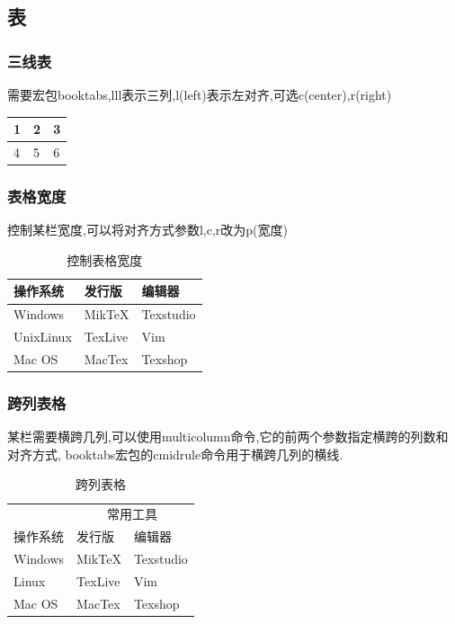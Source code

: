 \documentclass[UTF8,a4paper,8pt,no-math]{article} %
\numberwithin{equation}{section} %
\begin{document}
\subsection{表}
\subsubsection{三线表}
需要宏包booktabs,lll表示三列,l(left)表示左对齐,可选c(center),r(right)
\begin{table}[htbp]
	\center
	\begin{tabular}{lll}
		\toprule
		\toprule
		1 & 2 & 3 \\
		\midrule
		4 & 5 & 6 \\
		\bottomrule
	\end{tabular}
\end{table}

\subsubsection{表格宽度}
控制某栏宽度,可以将对齐方式参数l,c,r改为p(宽度)
\begin{table}[htbp]
	\caption{控制表格宽度}
	\center
	\begin{tabular}{p{100pt}p{100pt}p{100pt}}
		\toprule
		操作系统  & 发行版  & 编辑器    \\
		\midrule
		Windows   & MikTeX  & Texstudio \\
		UnixLinux & TexLive & Vim       \\
		Mac OS    & MacTex  & Texshop   \\
		\bottomrule
	\end{tabular}
\end{table}

\subsubsection{跨列表格}
某栏需要横跨几列,可以使用multicolumn命令,它的前两个参数指定横跨的列数和对齐方式,
booktabs宏包的cmidrule命令用于横跨几列的横线.
\begin{table}[htbp]
	\caption{跨列表格}
	\center
	\begin{tabular}{lll}
		\toprule
		         & \multicolumn{2}{c}{常用工具}             \\ %
		\cmidrule{2-3} %
		操作系统 & 发行版                       & 编辑器    \\
		\midrule
		Windows  & MikTeX                       & Texstudio \\
		Linux    & TexLive                      & Vim       \\
		Mac OS   & MacTex                       & Texshop   \\
		\bottomrule
	\end{tabular}
\end{table}
\end{document}
